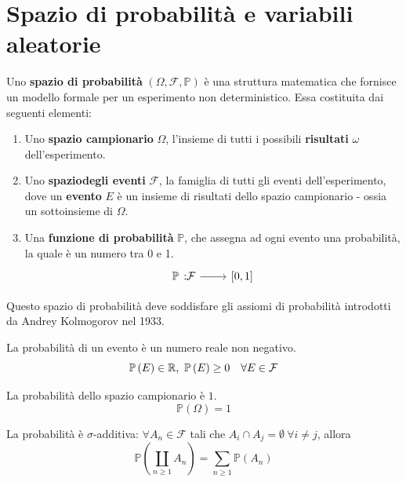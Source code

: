 \section{Spazio di probabilità e variabili aleatorie}
\begin{define}
	Uno \textbf{spazio di probabilità} $\left(\Omega,\mathcal{F},\mathbb{P}\right)$ è una struttura matematica che fornisce un modello formale per un esperimento non deterministico. Essa costituita dai seguenti elementi:
	\begin{enumerate}
		\item Uno \textbf{spazio campionario} $\Omega$, l'insieme di tutti i possibili \textbf{risultati} $\omega$ dell'esperimento.
		\item Uno \textbf{spaziodegli eventi} $\mathcal{F}$, la famiglia di tutti gli eventi dell'esperimento, dove un \textbf{evento} $E$ è un insieme di risultati dello spazio campionario - ossia un sottoinsieme di $\Omega$.
		\item Una \textbf{funzione di probabilità} $\mathbb{P}$, che assegna ad ogni evento una probabilità, la quale è un numero tra 0 e 1.
		\begin{equation}
			\funz{\mathbb{P}}{\mathcal{F}}{\left[0,1\right]}
		\end{equation}
	\end{enumerate}
\end{define}
Questo spazio di probabilità deve soddisfare gli assiomi di probabilità introdotti da Andrey Kolmogorov nel 1933.
\begin{axiom}
	La probabilità di un evento è un numero reale non negativo.
	\begin{equation}
		\mathbb{P}\left(E\right)\in\realset,\ \mathbb{P}\left(E\right)\geq 0\quad \forall E\in\mathcal{F} 
	\end{equation}
\end{axiom}
\begin{axiom}
	La probabilità dello spazio campionario è $1$.
	\begin{equation}
		\mathbb{P}\left(\Omega\right)=1
	\end{equation}
\end{axiom}
\begin{axiom}
	La probabilità è $\sigma$-additiva:	$\forall A_n\in\mathcal{F}$ tali che $A_i\cap A_j=\emptyset\ \forall i\neq j$, allora
	\begin{equation}
		\mathbb{P}\left(\coprod_{n\geq 1}A_n\right)=\sum_{n\geq 1}\mathbb{P}\left(A_n\right)
	\end{equation}
\end{axiom}
